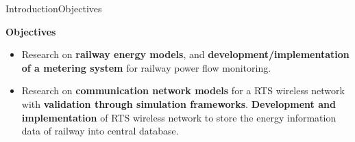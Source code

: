 	

		
		
		
		
	





\begin{frame}{Introduction}{Objectives}
\begin{block}{\textbf{Objectives}}
\begin{itemize}
	\setlength\itemsep{0em}
	
	\item	Research on \textbf{railway energy models}, and \textbf{development/implementation of a metering system} for railway power flow monitoring.
	\item Research on \textbf{communication network models} for a \ac{RTS} wireless network with \textbf{validation through simulation frameworks}.
	\textbf{Development and implementation} of \ac{RTS} wireless network to store the energy information data of railway into central database.
	
	
\end{itemize}
\end{block}
\end{frame}
